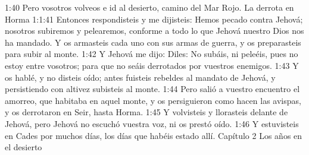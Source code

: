 1:40 Pero vosotros volveos e id al desierto, camino del Mar Rojo.  
La derrota en Horma   
1:1:41 Entonces respondisteis y me dijisteis: Hemos pecado contra Jehová; nosotros subiremos y pelearemos, conforme a todo lo que Jehová nuestro Dios nos ha mandado. Y os armasteis cada uno con sus armas de guerra, y os preparasteis para subir al monte.  
1:42 Y Jehová me dijo: Diles: No subáis, ni peleéis, pues no estoy entre vosotros; para que no seáis derrotados por vuestros enemigos.  
1:43 Y os hablé, y no disteis oído; antes fuisteis rebeldes al mandato de Jehová, y persistiendo con altivez subisteis al monte.  
1:44 Pero salió a vuestro encuentro el amorreo, que habitaba en aquel monte, y os persiguieron como hacen las avispas, y os derrotaron en Seir, hasta Horma.  
1:45 Y volvisteis y llorasteis delante de Jehová, pero Jehová no escuchó vuestra voz, ni os prestó oído.  
1:46 Y estuvisteis en Cades por muchos días, los días que habéis estado allí.  
Capítulo 2
Los años en el desierto  

